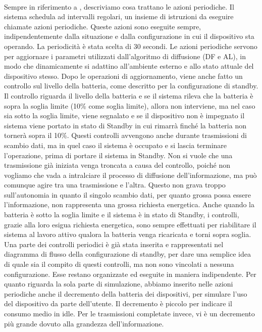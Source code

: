 \\
Sempre in riferimento a , descriviamo cosa trattano le azioni periodiche. Il sistema schedula ad intervalli regolari, un insieme di istruzioni da eseguire chiamate azioni periodiche. Queste azioni sono eseguite sempre, indipendentemente dalla situazione e dalla configurazione in cui il dispositivo sta operando. La periodicità è stata scelta di 30 secondi. Le azioni periodiche servono per aggiornare i parametri utilizzati dall'algoritmo di diffusione (\acs{DF} e \acs{AL}), in modo che dinamicamente si adattino all'ambiente esterno e allo stato attuale del dispositivo stesso. Dopo le operazioni di aggiornamento, viene anche fatto un controllo sul livello della batteria, come descritto per la configurazione di standby. Il controllo riguarda il livello della batteria e se il sistema rileva che la batteria è sopra la soglia limite (10\% come soglia limite), allora non interviene, ma nel caso sia sotto la soglia limite, viene segnalato e se il dispositivo non è impegnato il sistema viene portato in stato di Standby in cui rimarrà finché la batteria non tornerà sopra il 10\%. Questi controlli avvengono anche durante trasmissioni di scambio dati, ma in quel caso il sistema è occupato e si lascia terminare l'operazione, prima di portare il sistema in Standby. Non si vuole che una trasmissione già iniziata venga troncata a causa del controllo, poiché non vogliamo che vada a intralciare il processo di diffusione dell'informazione, ma può comunque agire tra una trasmissione e l'altra. Questo non grava troppo sull'autonomia in quanto il singolo scambio dati, per quanto grossa possa essere l'informazione, non rappresenta una grossa richiesta energetica. Anche quando la batteria è sotto la soglia limite e il sistema è in stato di Standby, i controlli, grazie alla loro esigua richiesta energetica, sono sempre effettuati per riabilitare il sistema al lavoro attivo qualora la batteria venga ricaricata e torni sopra soglia. Una parte dei controlli periodici è già stata inserita e rappresentati nel diagramma di flusso della configurazione di standby, per dare una semplice idea di quale sia il compito di questi controlli, ma non sono vincolati a nessuna configurazione. Esse restano organizzate ed eseguite in maniera indipendente. Per quanto riguarda la sola parte di simulazione, abbiamo inserito nelle azioni periodiche anche il decremento della batteria dei dispositivi, per simulare l'uso del dispositivo da parte dell'utente. Il decremento è piccolo per indicare il consumo medio in idle. Per le trasmissioni completate invece, vi è un decremento più grande dovuto alla grandezza dell'informazione.
\bigskip

